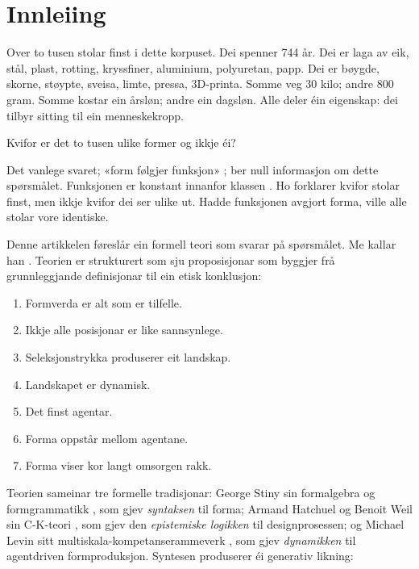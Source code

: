 \section{Innleiing}
\label{sec:introduction-nn}

Over to tusen stolar finst i dette korpuset. Dei spenner 744 år. Dei er laga av eik, stål, plast, rotting, kryssfiner, aluminium, polyuretan, papp. Dei er bøygde, skorne, støypte, sveisa, limte, pressa, 3D-printa. Somme veg 30 kilo; andre 800 gram. Somme kostar ein årsløn; andre ein dagsløn. Alle deler éin eigenskap: dei tilbyr sitting til ein menneskekropp.

Kvifor er det to tusen ulike former og ikkje éi?

Det vanlege svaret; «form følgjer funksjon» \parencite{Sullivan1896}; ber null informasjon om dette spørsmålet. Funksjonen er konstant innanfor klassen \parencite{Michl1995}. Ho forklarer kvifor stolar finst, men ikkje kvifor dei ser ulike ut. Hadde funksjonen avgjort forma, ville alle stolar vore identiske.

Denne artikkelen føreslår ein formell teori som svarar på spørsmålet. Me kallar han \formlaere{}. Teorien er strukturert som sju proposisjonar som byggjer frå grunnleggjande definisjonar til ein etisk konklusjon:

\begin{enumerate}
\item Formverda er alt som er tilfelle.
\item Ikkje alle posisjonar er like sannsynlege.
\item Seleksjonstrykka produserer eit landskap.
\item Landskapet er dynamisk.
\item Det finst agentar.
\item Forma oppstår mellom agentane.
\item Forma viser kor langt omsorgen rakk.
\end{enumerate}

Teorien sameinar tre formelle tradisjonar: George Stiny sin formalgebra og formgrammatikk \parencite{Stiny1972, Stiny2006}, som gjev \textit{syntaksen} til forma; Armand Hatchuel og Benoit Weil sin C-K-teori \parencite{Hatchuel2003, Hatchuel2009}, som gjev den \textit{epistemiske logikken} til designprosessen; og Michael Levin sitt multiskala-kompetanserammeverk \parencite{Levin2022, Fields2022, Doctor2024}, som gjev \textit{dynamikken} til agentdriven formproduksjon. Syntesen produserer éi generativ likning:

